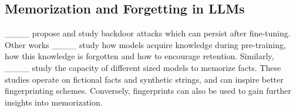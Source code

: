 \subsection{Memorization and Forgetting in LLMs }
____ propose and study backdoor attacks which can persist after fine-tuning.   Other works ____ study how models acquire knowledge during pre-training, how this knowledge is forgotten and how to encourage retention. Similarly, ____ study 
the capacity of different sized models to memorize facts. These studies operate on fictional facts and synthetic strings, and can inspire better fingerprinting schemes. Conversely, fingerprints can also be used to gain further insights into memorization.